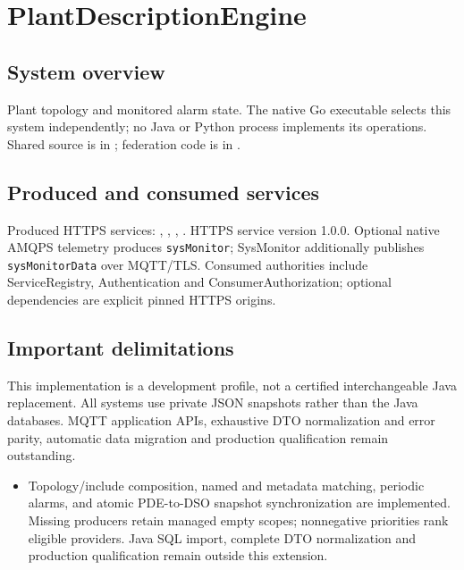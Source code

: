 \documentclass[a4paper]{arrowhead}
\begin{document}
\ArrowheadSetup
\section{PlantDescriptionEngine}
\subsection{System overview}
Plant topology and monitored alarm state. The native Go executable selects this system independently; no Java or Python process implements its operations. Shared source is in ; federation code is in .
\subsection{Produced and consumed services}
Produced HTTPS services: , \allowbreak {}, \allowbreak {}, \allowbreak {}.
HTTPS service version 1.0.0. Optional native AMQPS telemetry produces \texttt{sysMonitor}; SysMonitor additionally publishes \texttt{sysMonitorData} over MQTT/TLS. Consumed authorities include ServiceRegistry, Authentication and ConsumerAuthorization; optional dependencies are explicit pinned HTTPS origins.
\subsection{Important delimitations}
This implementation is a development profile, not a certified interchangeable Java replacement. All systems use private JSON snapshots rather than the Java databases. MQTT application APIs, exhaustive DTO normalization and error parity, automatic data migration and production qualification remain outstanding.
\begin{itemize}
\item Topology/include composition, named and metadata matching, periodic alarms, and atomic PDE-to-DSO snapshot synchronization are implemented. Missing producers retain managed empty scopes; nonnegative priorities rank eligible providers. Java SQL import, complete DTO normalization and production qualification remain outside this extension.
\end{itemize}
\end{document}
